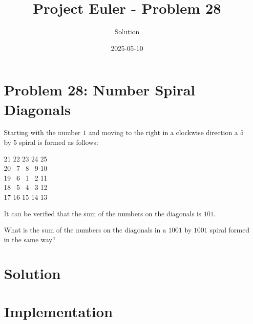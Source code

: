 \documentclass{article}
\title{Project Euler - Problem 28}
\author{Solution}
\date{2025-05-10}
\begin{document}
\maketitle

\section*{Problem 28: Number Spiral Diagonals}


Starting with the number $1$ and moving to the right in a clockwise direction a $5$ by $5$ spiral is formed as follows:

\par
21 22 23 24 25 \\
20  7  8  9 10 \\
19  6  1  2 11 \\
18  5  4  3 12 \\
17 16 15 14 13 \\

\par
It can be verified that the sum of the numbers on the diagonals is $101$.

\par
What is the sum of the numbers on the diagonals in a $1001$ by $1001$ spiral formed in the same way?

\par


\section*{Solution}


\section*{Implementation}

\end{document}
